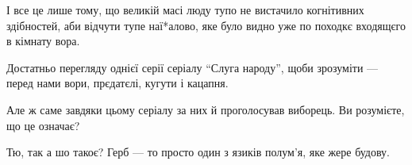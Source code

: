 І все це лише тому, що великій масі люду тупо не вистачило когнітивних
здібностей, аби відчути тупе наї*алово, яке було видно уже по походкє входящєго
в кімнату вора.

Достатньо перегляду однієї серії серіалу \enquote{Слуга народу}, щоби зрозуміти --- перед
нами вори, прєдатєлі, кугути і кацапня.

Але ж саме завдяки цьому серіалу за них й проголосував виборець. Ви розумієте,
що це означає?

Тю, так а шо такоє? Герб --- то просто один з язиків полум'я, яке жере будову.

